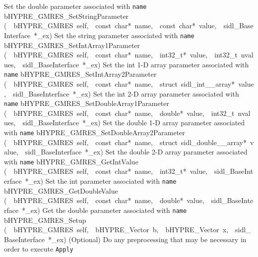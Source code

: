 \documentclass{article}
\begin{document}
\begin{cxxentry}
\begin{cxxentry}
\begin{cxxnames}
        {
Set the double parameter associated with {\tt name}}
        {}
\label{cxx.10.2.21}
        {bHYPRE\_GMRES\_SetStringParameter}
        {(\ \ bHYPRE\_GMRES\ self,\ \ const\ char*\ name,\ \ const\ char*\ value,\ \ sidl\_BaseInterface\ *\_ex)}
        {
Set the string parameter associated with {\tt name}}
        {}
\label{cxx.10.2.22}
        {bHYPRE\_GMRES\_SetIntArray1Parameter}
        {(\ \ bHYPRE\_GMRES\ self,\ \ const\ char*\ name,\ \ int32\_t*\ value,\ \ int32\_t\ nvalues,\ \ sidl\_BaseInterface\ *\_ex)}
        {
Set the int 1-D array parameter associated with {\tt name}}
        {}
\label{cxx.10.2.23}
        {bHYPRE\_GMRES\_SetIntArray2Parameter}
        {(\ \ bHYPRE\_GMRES\ self,\ \ const\ char*\ name,\ \ struct\ sidl\_int\_\_array*\ value,\ \ sidl\_BaseInterface\ *\_ex)}
        {
Set the int 2-D array parameter associated with {\tt name}}
        {}
\label{cxx.10.2.24}
        {bHYPRE\_GMRES\_SetDoubleArray1Parameter}
        {(\ \ bHYPRE\_GMRES\ self,\ \ const\ char*\ name,\ \ double*\ value,\ \ int32\_t\ nvalues,\ \ sidl\_BaseInterface\ *\_ex)}
        {
Set the double 1-D array parameter associated with {\tt name}}
        {}
\label{cxx.10.2.25}
        {bHYPRE\_GMRES\_SetDoubleArray2Parameter}
        {(\ \ bHYPRE\_GMRES\ self,\ \ const\ char*\ name,\ \ struct\ sidl\_double\_\_array*\ value,\ \ sidl\_BaseInterface\ *\_ex)}
        {
Set the double 2-D array parameter associated with {\tt name}}
        {}
\label{cxx.10.2.26}
        {bHYPRE\_GMRES\_GetIntValue}
        {(\ \ bHYPRE\_GMRES\ self,\ \ const\ char*\ name,\ \ int32\_t*\ value,\ \ sidl\_BaseInterface\ *\_ex)}
        {
Set the int parameter associated with {\tt name}}
        {}
\label{cxx.10.2.27}
        {bHYPRE\_GMRES\_GetDoubleValue}
        {(\ \ bHYPRE\_GMRES\ self,\ \ const\ char*\ name,\ \ double*\ value,\ \ sidl\_BaseInterface\ *\_ex)}
        {
Get the double parameter associated with {\tt name}}
        {}
\label{cxx.10.2.28}
        {bHYPRE\_GMRES\_Setup}
        {(\ \ bHYPRE\_GMRES\ self,\ \ bHYPRE\_Vector\ b,\ \ bHYPRE\_Vector\ x,\ \ sidl\_BaseInterface\ *\_ex)}
        {
(Optional) Do any preprocessing that may be necessary in
order to execute {\tt Apply}}
        {}
\label{cxx.10.2.29}

\end{cxxnames}
\end{cxxentry}
\end{cxxentry}
\end{document}
